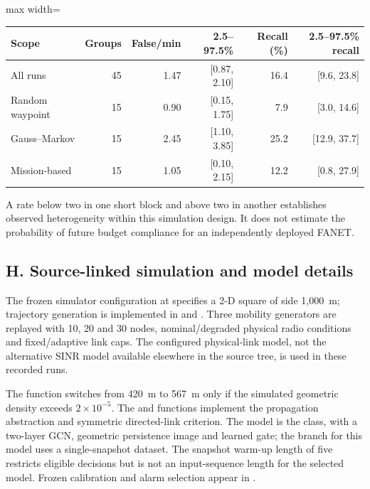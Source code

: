 \documentclass[10pt,a4paper]{article}
\begin{document}
\begin{center}
\small
\setlength{\tabcolsep}{4pt}
\begin{adjustbox}{max width=\linewidth}\begin{tabular}{lrrrrr}
\toprule
Scope & Groups & False/min & 2.5--97.5\% & Recall (\%) & 2.5--97.5\% recall \\
\midrule
All runs & 45 & 1.47 & [0.87, 2.10] & 16.4 & [9.6, 23.8] \\
Random waypoint & 15 & 0.90 & [0.15, 1.75] & 7.9 & [3.0, 14.6] \\
Gauss--Markov & 15 & 2.45 & [1.10, 3.85] & 25.2 & [12.9, 37.7] \\
Mission-based & 15 & 1.05 & [0.10, 2.15] & 12.2 & [0.8, 27.9] \\
\bottomrule
\end{tabular}\end{adjustbox}
\end{center}

\noindent A rate below two in one short block and above two in another establishes observed heterogeneity within this simulation design. It does not estimate the probability of future budget compliance for an independently deployed FANET.


\subsection*{H. Source-linked simulation and model details}

The frozen simulator configuration at  specifies a 2-D square of side 1,000~m; trajectory generation is implemented in  and . Three mobility generators are replayed with 10, 20 and 30 nodes, nominal/degraded physical radio conditions and fixed/adaptive link caps. The configured physical-link model, not the alternative SINR model available elsewhere in the source tree, is used in these recorded runs.

The  function switches from 420~m to 567~m only if the simulated geometric density exceeds $2\times10^{-5}$. The  and  functions implement the propagation abstraction and symmetric directed-link criterion. The model is the  class, with a two-layer GCN, geometric persistence image and learned gate; the  branch for this model uses a single-snapshot dataset. The snapshot warm-up length of five restricts eligible decisions but is not an input-sequence length for the selected model. Frozen calibration and alarm selection appear in .
\end{document}
